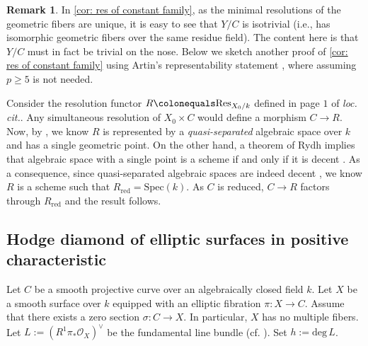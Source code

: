\documentclass[11pt, letterpaper]{amsart}
\theoremstyle{plain}
\theoremstyle{definition}
\newtheorem{remark}[theorem]{Remark}
\newcommand{\Spec}{\mathrm{Spec}}
\newcommand{\<}{\langle}
\renewcommand{\>}{\rangle}
\newcommand{\sO}{\mathcal{O}}
\begin{document}
\begin{remark}
\label{rmk:short_proof_on_constancy}
In \cref{cor: res of constant family}, as the minimal resolutions of the geometric fibers are unique, it is easy to see that $Y/C$ is isotrivial (i.e., has isomorphic geometric fibers over the same residue field). 
The content here is that $Y/C$ must in fact be trivial on the nose.
Below we sketch another proof of \cref{cor: res of constant family} using Artin's representability statement \cite[Thm.~1]{Artin-Res}, where assuming $p \ge 5$ is not needed.

Consider the resolution functor $R \colonequals \mathrm{Res}_{X_0/k}$ defined in page $1$ of \textit{loc. cit.}. 
Any simultaneous resolution of $X_0 \times C$ would define a morphism $C \to R$. 
Now, by \cite[Thm.~1]{Artin-Res}, we know $R$ is represented by a \textit{quasi-separated} algebraic space over $k$ and has a single geometric point.
On the other hand, a theorem of Rydh implies that algebraic space with a single point is a scheme if and only if it is decent \cite[\href{https://stacks.math.columbia.edu/tag/047Z}{Tag 047Z}, \href{https://stacks.math.columbia.edu/tag/086U}{086U}]{stacks-project}. 
As a consequence, since quasi-separated algebraic spaces are indeed decent \cite[\href{https://stacks.math.columbia.edu/tag/03I7}{Tag 03I7}]{stacks-project}, we know $R$ is a scheme such that $R_{\mathrm{red}} = \Spec(k)$. 
As $C$ is reduced, $C \to R$ factors through $R_{\mathrm{red}}$ and the result follows. 
\end{remark}

\subsection{Hodge diamond of elliptic surfaces in positive characteristic}


Let $C$ be a smooth projective curve over an algebraically closed field $k$. Let $X$ be a smooth surface over $k$ equipped with an elliptic fibration $\pi : X \to C$. 
Assume that there exists a zero section $\sigma : C \to X$. 
In particular, $X$ has no multiple fibers. 
Let $L := (R^1 \pi_* \sO_X)^\vee$ be the fundamental line bundle (cf. \cite[II.4]{Miranda}). 
Set $h := \mathrm{deg\,}L$.
\end{document}
